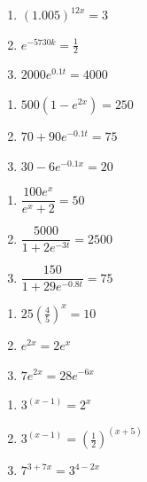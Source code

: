 \begin{multicols}{3}
\begin{enumerate}
\setcounter{enumi}{\value{HW}}

\item $(1.005)^{12x} = 3$
\item $e^{-5730k} = \frac{1}{2}$ 
\item $2000e^{0.1t} = 4000$  

\setcounter{HW}{\value{enumi}}
\end{enumerate}
\end{multicols}

\begin{multicols}{3}
\begin{enumerate}
\setcounter{enumi}{\value{HW}}


\item $500\left(1-e^{2x}\right) = 250$
\item $70 + 90e^{-0.1t} = 75$ 
\item $30-6e^{-0.1x}=20$ 


\setcounter{HW}{\value{enumi}}
\end{enumerate}
\end{multicols}

\begin{multicols}{3}
\begin{enumerate}
\setcounter{enumi}{\value{HW}}

\item $\dfrac{100e^{x}}{e^{x}+2}=50$ 
\item $\dfrac{5000}{1+2e^{-3t}}=2500$ 
\item $\dfrac{150}{1 + 29e^{-0.8t}} = 75$ 


\setcounter{HW}{\value{enumi}}
\end{enumerate}
\end{multicols}

\begin{multicols}{3}
\begin{enumerate}
\setcounter{enumi}{\value{HW}}

\item $25\left(\frac{4}{5}\right)^{x} = 10$  

\item $e^{2x} = 2e^{x}$ 
\item  $7e^{2x} = 28e^{-6x}$ 

\setcounter{HW}{\value{enumi}}
\end{enumerate}
\end{multicols}

\begin{multicols}{3}
\begin{enumerate}
\setcounter{enumi}{\value{HW}}

\item $3^{(x - 1)} = 2^{x}$ 
\item $3^{(x - 1)} = \left(\frac{1}{2}\right)^{(x + 5)}$ 
\item  $7^{3+7x} = 3^{4-2x}$  

\setcounter{HW}{\value{enumi}}
\end{enumerate}
\end{multicols}

